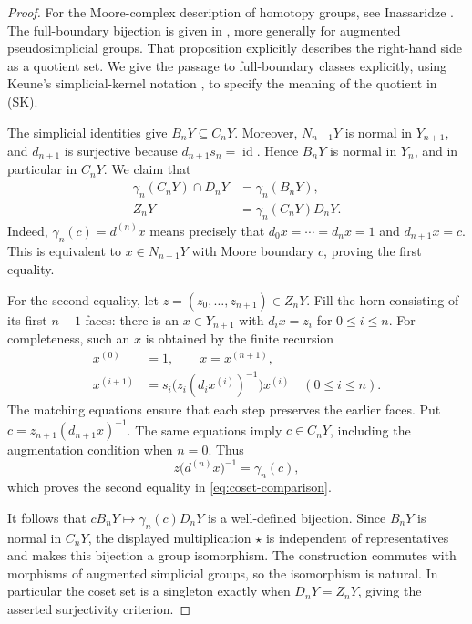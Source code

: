 \documentclass[10pt,a4paper]{amsart}
\newcommand{\id}{\operatorname{id}}
\begin{document}
\begin{proof}
For the Moore-complex description of homotopy groups, see
Inassaridze \cite[Chapter~2, pp.~35--36, Definition~2.2]{Inassaridze}.
The full-boundary bijection is given in
\cite[Chapter~2, Proposition~2.14, pp.~41--42]{Inassaridze}, more
generally for augmented pseudosimplicial groups. That proposition
explicitly describes the right-hand side as a quotient set.
We give the passage to full-boundary classes explicitly, using Keune's
simplicial-kernel notation \cite{Keune}, to specify the meaning of the
quotient in \textup{(SK)}.

The simplicial identities give $B_nY\subseteq C_nY$.
Moreover, $N_{n+1}Y$ is normal in $Y_{n+1}$, and $d_{n+1}$ is
surjective because $d_{n+1}s_n=\id$. Hence $B_nY$ is normal in
$Y_n$, and in particular in $C_nY$.
We claim that
\begin{equation}\label{eq:coset-comparison}
 \begin{aligned}
 \gamma_n(C_nY)\cap D_nY&=\gamma_n(B_nY),\\
 Z_nY&=\gamma_n(C_nY)D_nY.
 \end{aligned}
\end{equation}
Indeed, $\gamma_n(c)=d^{(n)}x$ means precisely that
$d_0x=\cdots=d_nx=1$ and $d_{n+1}x=c$. This is equivalent to
$x\in N_{n+1}Y$ with Moore boundary $c$, proving the first equality.

For the second equality, let $z=(z_0,\ldots,z_{n+1})\in Z_nY$.
Fill the horn consisting of its first $n+1$ faces: there is an
$x\in Y_{n+1}$ with $d_ix=z_i$ for $0\leq i\leq n$.
For completeness, such an $x$ is obtained by the finite recursion
\[
 \begin{aligned}
 x^{(0)}&=1,\qquad x=x^{(n+1)},\\
 x^{(i+1)}&=s_i\bigl(z_i(d_ix^{(i)})^{-1}\bigr)x^{(i)}
 \quad(0\leq i\leq n).
 \end{aligned}
\]
The matching equations ensure that each step preserves the earlier
faces. Put $c=z_{n+1}(d_{n+1}x)^{-1}$. The same equations imply
$c\in C_nY$, including the augmentation condition when $n=0$.
Thus
\[
 z\bigl(d^{(n)}x\bigr)^{-1}=\gamma_n(c),
\]
which proves the second equality in \eqref{eq:coset-comparison}.

It follows that $cB_nY\mapsto\gamma_n(c)D_nY$ is a well-defined
bijection. Since $B_nY$ is normal in $C_nY$, the displayed
multiplication $\star$ is independent of representatives and makes
this bijection a group isomorphism. The construction commutes with
morphisms of augmented simplicial groups, so the isomorphism is
natural. In particular the coset set is a singleton exactly when
$D_nY=Z_nY$, giving the asserted surjectivity criterion.


\end{proof}
\end{document}
